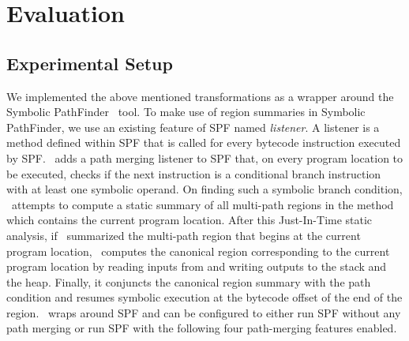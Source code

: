 \section{Evaluation}
\label{sec:results}
\subsection{Experimental Setup}
%
We implemented the above mentioned transformations as a wrapper around the Symbolic PathFinder~\cite{spf} tool.
%
To make use of region summaries in Symbolic PathFinder, we use an existing feature of SPF named \textit{listener}.
%
A listener is a method defined within SPF that is called for every bytecode instruction executed by SPF.
%
\tool\ adds a path merging listener to SPF that, on every program location to be executed, checks if the next
instruction is a conditional branch instruction with at least one symbolic operand.
%
On finding such a symbolic branch condition, \tool\ attempts to compute a static summary of all multi-path
regions in the method which contains the current program location.
%
After this Just-In-Time static analysis, if \tool\ summarized the multi-path region that begins at the current program
location, \tool\ computes the canonical region corresponding to the current program location by reading inputs from
and writing outputs to the stack and the heap.
%
Finally, it conjuncts the canonical region summary with the path condition and resumes symbolic execution at the
bytecode offset of the end of the region.
%
\tool\ wraps around SPF and can be configured to either run SPF without any path merging or run SPF with the
following four path-merging features enabled.

